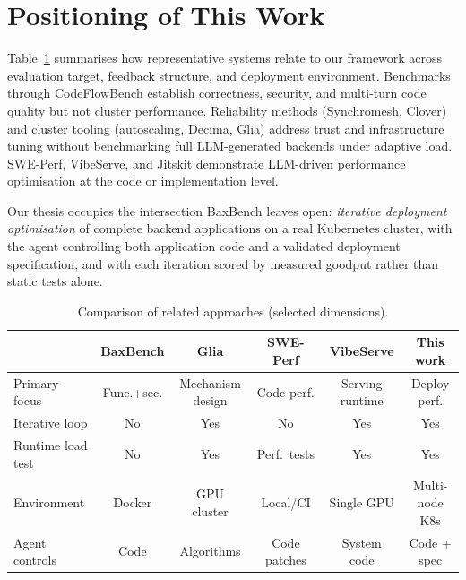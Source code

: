 \section{Positioning of This Work}
\label{sec:rw-positioning}

Table~\ref{tab:rw-comparison} summarises how representative systems relate to
our framework across evaluation target, feedback structure, and deployment
environment.  Benchmarks through CodeFlowBench establish correctness, security,
and multi-turn code quality but not cluster performance.  Reliability methods
(Synchromesh, Clover) and cluster tooling (autoscaling, Decima, Glia) address
trust and infrastructure tuning without benchmarking full LLM-generated backends
under adaptive load.  SWE-Perf, VibeServe, and Jitskit demonstrate LLM-driven
performance optimisation at the code or implementation level.

Our thesis occupies the intersection BaxBench leaves open: \emph{iterative
deployment optimisation} of complete backend applications on a real Kubernetes
cluster, with the agent controlling both application code and a validated
deployment specification, and with each iteration scored by measured goodput
rather than static tests alone.

\begin{table}[t]
  \centering
  \caption{Comparison of related approaches (selected dimensions).}
  \label{tab:rw-comparison}
  \small
  \begin{tabular}{@{}l c c c c c@{}}
    \toprule
    & \textbf{BaxBench} & \textbf{Glia} & \textbf{SWE-Perf} &
      \textbf{VibeServe} & \textbf{This work} \\
    \midrule
    Primary focus
      & Func.+sec.
      & Mechanism design
      & Code perf.
      & Serving runtime
      & Deploy perf. \\
    Iterative loop
      & No
      & Yes
      & No
      & Yes
      & Yes \\
    Runtime load test
      & No
      & Yes
      & Perf.\ tests
      & Yes
      & Yes \\
    Environment
      & Docker
      & GPU cluster
      & Local/CI
      & Single GPU
      & Multi-node K8s \\
    Agent controls
      & Code
      & Algorithms
      & Code patches
      & System code
      & Code + spec \\
    \bottomrule
  \end{tabular}
\end{table}
